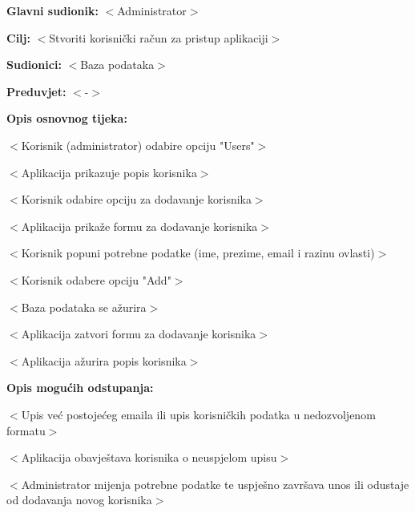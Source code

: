 					\noindent {}
					\begin{packed_item}

						\item \textbf{Glavni sudionik:} $<$Administrator$>$
						\item \textbf{Cilj:} $<$Stvoriti korisnički račun za pristup aplikaciji$>$
						\item \textbf{Sudionici:} $<$Baza podataka$>$
						\item \textbf{Preduvjet:} $<$-$>$
						\item \textbf{Opis osnovnog tijeka:}

						\item[] \begin{packed_enum}

							\item $<$Korisnik (administrator) odabire opciju "Users"$>$
							\item $<$Aplikacija prikazuje popis korisnika$>$
							\item $<$Korisnik odabire opciju za dodavanje korisnika$>$
							\item $<$Aplikacija prikaže formu za dodavanje korisnika$>$
							\item $<$Korisnik popuni potrebne podatke (ime, prezime, email i razinu ovlasti)$>$
							\item $<$Korisnik odabere opciju "Add"$>$
							\item $<$Baza podataka se ažurira$>$
							\item $<$Aplikacija zatvori formu za dodavanje korisnika$>$
							\item $<$Aplikacija ažurira popis korisnika$>$
						\end{packed_enum}

						\item \textbf{Opis mogućih odstupanja:}

						\item[] \begin{packed_item}

							\item[3.a] $<$Upis već postojećeg emaila ili upis korisničkih
							podatka u nedozvoljenom formatu$>$
							\item[] \begin{packed_enum}

								\item $<$Aplikacija obavještava korisnika o neuspjelom upisu$>$
								\item $<$Administrator mijenja potrebne podatke te uspješno završava unos ili
								odustaje od dodavanja novog korisnika$>$

							\end{packed_enum}

						\end{packed_item}
					\end{packed_item}

